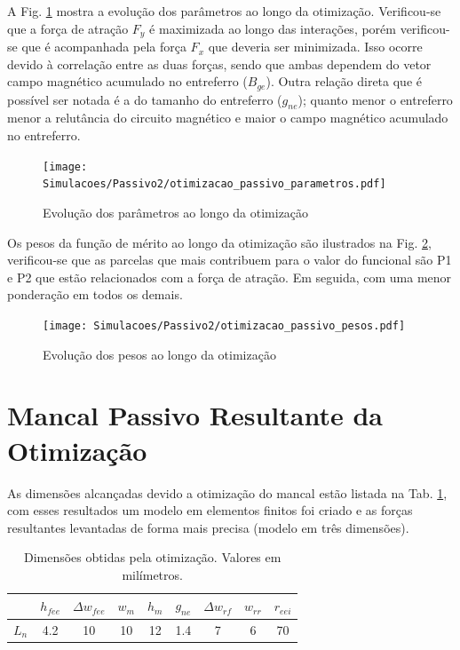 A Fig. \ref{fig:otimizacao_passivo_parametros} mostra a evolução dos parâmetros ao longo da otimização. Verificou-se que a força de atração $F_y$ é maximizada ao longo das interações, porém verificou-se que é acompanhada pela força $F_x$ que deveria ser minimizada. Isso ocorre devido à correlação entre as duas forças, sendo que ambas dependem do vetor campo magnético acumulado no entreferro ($B_{ge}$). Outra relação direta que é possível ser notada é a do tamanho do entreferro ($g_{ne}$); quanto menor o entreferro menor a relutância do circuito magnético e maior o campo magnético acumulado no entreferro.


\begin{figure}[bh!]
	\centering
	\texttt{[image: Simulacoes/Passivo2/otimizacao\_passivo\_parametros.pdf]}
	\caption{Evolução dos parâmetros ao longo da otimização}
	\label{fig:otimizacao_passivo_parametros}
\end{figure} 

Os pesos da função de mérito ao longo da otimização são ilustrados na Fig. \ref{fig:otimizacao_passivo_pesos}, verificou-se que as parcelas que mais contribuem para o valor do funcional são P1 e P2 que estão relacionados com a força de atração. Em seguida, com uma menor ponderação em todos os demais. 

\begin{figure}[th!]
	\centering
	\texttt{[image: Simulacoes/Passivo2/otimizacao\_passivo\_pesos.pdf]}
	\caption{Evolução dos pesos ao longo da otimização}
	\label{fig:otimizacao_passivo_pesos}
\end{figure} 

\section{Mancal Passivo Resultante da Otimização}

As dimensões alcançadas devido a otimização do mancal estão listada na Tab. \ref{tab:passivo:dimensoes:otimizado}, com esses resultados um modelo em elementos finitos foi criado e as forças resultantes levantadas de forma mais precisa (modelo em três dimensões).

\begin{table}[ht!]
	\centering
	\begin{tabular}{c c c c c c c c c}
		& $h_{fee}$ &$\Delta w_{fee}$ & $w_m$ & $h_m$  & $g_{ne}$ & $\Delta w_{rf}$ & $w_{rr}$ & $r_{eei}$ \\ \hline \hline
		$L_{n}$  	&  4.2 &   10 &   10 &    12 &   1.4 &  7 &   6 &    70 \\
	\end{tabular} 
	\caption{Dimensões obtidas pela otimização. Valores em milímetros.}
	\label{tab:passivo:dimensoes:otimizado} 
\end{table}

